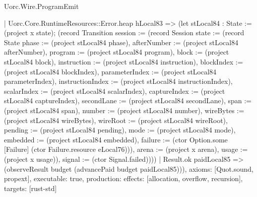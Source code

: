 \begin{lexlean}{Uorc.Wire.ProgramEmit}
\begin{semanticmodule}
{      | Uorc.Core.RuntimeResources::Error.heap hLocal83 => (let stLocal84 : State := (project x state); (record Transition {session := (record Session {state := (record State {phase := (project stLocal84 phase), afterNumber := (project stLocal84 afterNumber), program := (project stLocal84 program), block := (project stLocal84 block), instruction := (project stLocal84 instruction), blockIndex := (project stLocal84 blockIndex), parameterIndex := (project stLocal84 parameterIndex), instructionIndex := (project stLocal84 instructionIndex), scalarIndex := (project stLocal84 scalarIndex), captureIndex := (project stLocal84 captureIndex), secondLane := (project stLocal84 secondLane), span := (project stLocal84 span), number := (project stLocal84 number), wireBytes := (project stLocal84 wireBytes), wireRoot := (project stLocal84 wireRoot), pending := (project stLocal84 pending), mode := (project stLocal84 mode), embedded := (project stLocal84 embedded), failure := (ctor Option.some [Failure] (ctor Failure.resource eLocal76))}), arena := (project x arena), usage := (project x usage)}), signal := (ctor Signal.failed)})))
    | Result.ok paidLocal85 => (observeResult budget (advancePaid budget paidLocal85))),
  axioms: [Quot.sound, propext],
  executable: true,
  production: {effects: [allocation, overflow, recursion], targets: [rust-std]}
}


\end{semanticmodule}
\end{lexlean}
